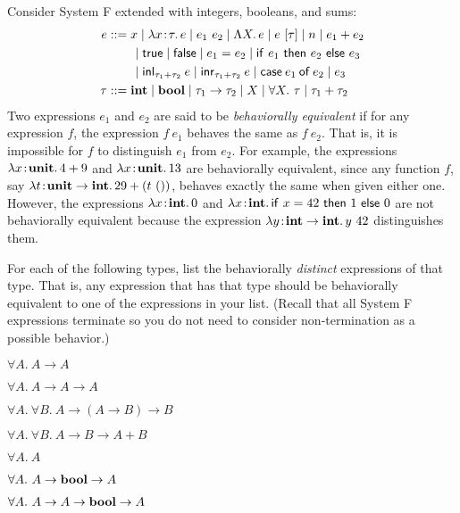 \documentclass[10pt]{article}
\begin{document}
\begin{exercise}
Consider System F extended with integers, booleans, and sums:
\begin{align*}
e    &::= x \mid \lam{x\ty\tau}{e} \mid e_1~e_2 \mid \Lam{X}{e} \mid e~[\tau] \mid n \mid e_1 + e_2  \\
     & \qquad \mid \lamfnt{true}  \mid \lamfnt{false} \mid e_1 = e_2 \mid \cond[\lamfnt]{e_1}{e_2}{e_3}  \\
     & \qquad \mid \inleft{\tau_1}{\tau_2}{e} \mid \inright{\tau_1}{\tau_2}{e} \mid \sumcase{e_1}{e_2}{e_3}\\
\tau &::= \typ{int} \mid \typ{bool} \mid \tau_1 \arrow \tau_2 \mid X \mid \forall X.~\tau \mid \tau_1 + \tau_2
\end{align*}
%
Two expressions $e_1$ and $e_2$ are said to be \emph{behaviorally
equivalent} if for any expression $f$, the expression $f~e_1$ behaves
the same as $f~e_2$. That is, it is impossible for $f$ to distinguish
$e_1$ from $e_2$. For example, the expressions
$\lam{x\ty\typ{unit}}{4+9}$ and $\lam{x\ty\typ{unit}}{13}$ are
behaviorally equivalent, since any function $f$, say
$\lam{t\ty\typ{unit}\arrow\typ{int}}{29+(t~())}$, behaves exactly the
same when given either one. However, the expressions
$\lam{x\ty\typ{int}}{0}$ and
$\lam{x\ty\typ{int}}{\cond[\lamfnt]{x=42}{1}{0}}$ are not behaviorally
equivalent because the expression
$\lam{y\ty{\typ{int}\arrow\typ{int}}}{y~42}$ distinguishes them.

For each of the following types, list the behaviorally \emph{distinct}
expressions of that type. That is, any expression that has that type
should be behaviorally equivalent to one of the expressions in your
list.  (Recall that all System F expressions terminate so you do not
need to consider non-termination as a possible behavior.)
%
\begin{enumerate}
\begin{minipage}{.5\textwidth}
\item $\forall A.~ A \rightarrow A$\\
\item $\forall A.~ A \rightarrow A \rightarrow A$\\
\item $\forall A.~\forall B.~ A \rightarrow (A \rightarrow B) \rightarrow B$\\
\item $\forall A.~\forall B.~ A \rightarrow B \rightarrow A + B$\\
\end{minipage}\begin{minipage}{.5\textwidth}
\item $\forall A.~ A$\\
\item $\forall A.~ A \rightarrow \typ{bool} \rightarrow A$\\
\item $\forall A.~ A \rightarrow A \rightarrow \typ{bool} \rightarrow A$\\
\bigskip\bigskip
\end{minipage}
\end{enumerate}


\end{exercise}
\end{document}
